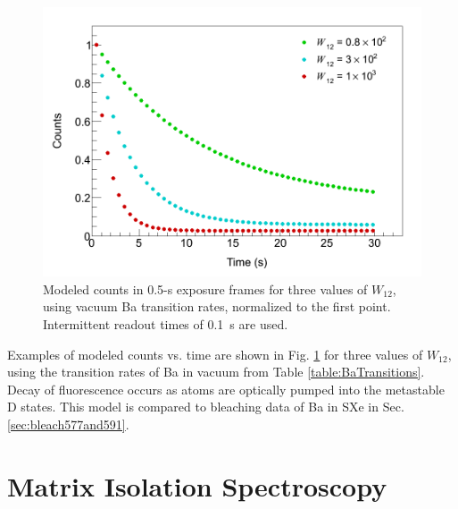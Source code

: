 \begin{figure} %
        \centering
                \includegraphics[width=.7\textwidth]{figures/thesis_modelExamples.png}
                \caption{Modeled counts in 0.5-s exposure frames for three values of $W_{12}$, using vacuum Ba transition rates, normalized to the first point.  Intermittent readout times of 0.1~s are used. }
\label{fig:modelExample}
\end{figure}

Examples of modeled counts vs. time are shown in Fig. \ref{fig:modelExample} for three values of $W_{12}$, using the transition rates of Ba in vacuum from Table \ref{table:BaTransitions}.  Decay of fluorescence occurs as atoms are optically pumped into the metastable D states.  This model is compared to bleaching data of Ba in SXe in Sec. \ref{sec:bleach577and591}.


\section{Matrix Isolation Spectroscopy}
\label{sec:matrix}

